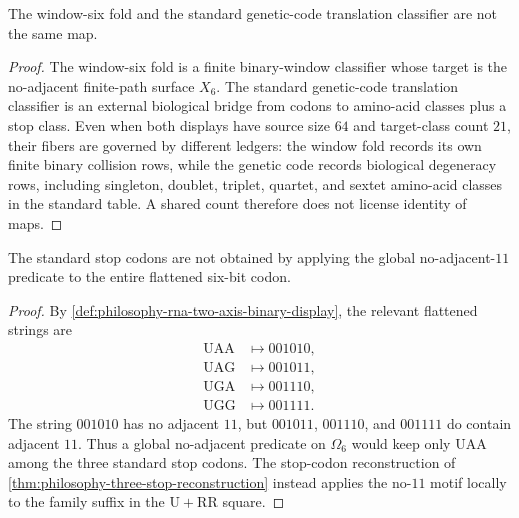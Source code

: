 
\begin{theorem}
\label{thm:philosophy-window-six-genetic-code-not-same-table}
The window-six fold and the standard genetic-code translation
classifier are not the same map.
\end{theorem}
\begin{proof}
The window-six fold is a finite binary-window classifier whose target is
the no-adjacent finite-path surface $X_{6}$. The standard genetic-code
translation classifier is an external biological bridge from codons to
amino-acid classes plus a stop class. Even when both displays have
source size $64$ and target-class count $21$, their fibers are governed
by different ledgers: the window fold records its own finite binary
collision rows, while the genetic code records biological degeneracy
rows, including singleton, doublet, triplet, quartet, and sextet
amino-acid classes in the standard table. A shared count therefore does
not license identity of maps.
\end{proof}

\begin{theorem}
\label{thm:philosophy-global-no-eleven-not-stop-classifier}
The standard stop codons are not obtained by applying the global
no-adjacent-$11$ predicate to the entire flattened six-bit codon.
\end{theorem}
\begin{proof}
By \autoref{def:philosophy-rna-two-axis-binary-display}, the relevant
flattened strings are
$$
\begin{aligned}
  \mathrm{UAA} &\longmapsto 001010,\\
  \mathrm{UAG} &\longmapsto 001011,\\
  \mathrm{UGA} &\longmapsto 001110,\\
  \mathrm{UGG} &\longmapsto 001111.
\end{aligned}
$$
The string $001010$ has no adjacent $11$, but $001011$, $001110$, and
$001111$ do contain adjacent $11$. Thus a global no-adjacent predicate
on $\Omega_{6}$ would keep only $\mathrm{UAA}$ among the three standard
stop codons. The stop-codon reconstruction of
\autoref{thm:philosophy-three-stop-reconstruction} instead applies the
no-$11$ motif locally to the family suffix in the
$\mathrm{U}+\mathrm{RR}$ square.
\end{proof}

